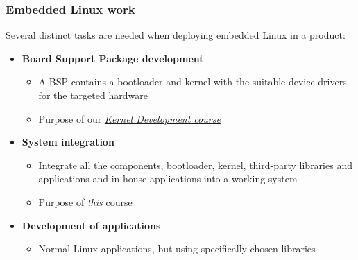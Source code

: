 \begin{frame}
  \frametitle{Embedded Linux work}

  Several distinct tasks are needed when deploying embedded Linux in a
  product:

  \begin{itemize}
  \item {\bf Board Support Package development}
    \begin{itemize}
    \item A BSP contains a bootloader and kernel with the suitable
      device drivers for the targeted hardware
    \item Purpose of our \href{https://bootlin.com/training/kernel}
      {\em Kernel Development course}
    \end{itemize}
  \item {\bf System integration}
    \begin{itemize}
    \item Integrate all the components, bootloader, kernel,
      third-party libraries and applications and in-house applications
      into a working system
    \item Purpose of {\em this} course
    \end{itemize}
  \item {\bf Development of applications}
    \begin{itemize}
    \item Normal Linux applications, but using specifically chosen
      libraries
    \end{itemize}
  \end{itemize}
\end{frame}
